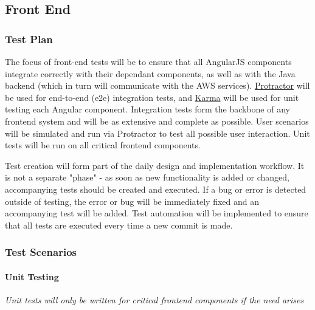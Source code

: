 \documentclass{article}
\begin{document}
	\subsection{Front End}
		\subsubsection{Test Plan}
		The focus of front-end tests will be to ensure that all AngularJS components integrate correctly with their dependant components, as well as with the Java backend (which in turn will communicate with the AWS services). \href{http://www.protractortest.org/#/}{Protractor} will be used for end-to-end (e2e) integration tests, and \href{https://karma-runner.github.io/1.0/index.html}{Karma} will be used for unit testing each Angular component. Integration tests form the backbone of any frontend system and will be as extensive and complete as possible. User scenarios will be simulated and run via Protractor to test all possible user interaction. Unit tests will be run on all critical frontend components.
		
		Test creation will form part of the daily design and implementation workflow. It is not a separate "phase" - as soon as new functionality is added or changed, accompanying tests should be created and executed. If a bug or error is detected outside of testing, the error or bug will be immediately fixed and an accompanying test will be added. Test automation will be implemented to ensure that all tests are executed every time a new commit is made. 
			
		\subsubsection{Test Scenarios}
			\paragraph{Unit Testing}
				\textit{Unit tests will only be written for critical frontend components if the need arises}
\end{document}
